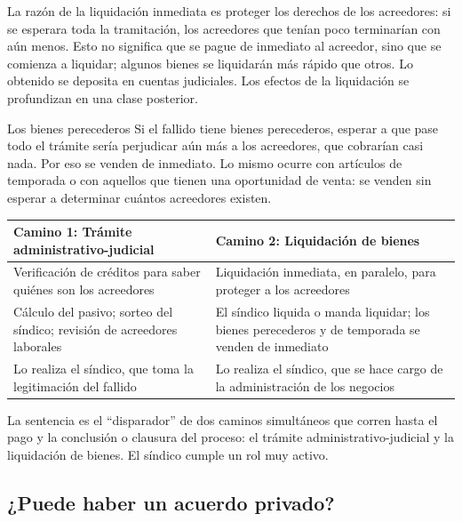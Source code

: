 \documentclass[12pt,oneside]{book}
\begin{document}
La razón de la liquidación inmediata es proteger los derechos de los acreedores: si se esperara toda la tramitación, los acreedores que tenían poco terminarían con aún menos. Esto no significa que se pague de inmediato al acreedor, sino que se comienza a liquidar; algunos bienes se liquidarán más rápido que otros. Lo obtenido se deposita en cuentas judiciales. Los efectos de la liquidación se profundizan en una clase posterior.

\begin{example}{Los bienes perecederos}
Si el fallido tiene bienes perecederos, esperar a que pase todo el trámite sería perjudicar aún más a los acreedores, que cobrarían casi nada. Por eso se venden de inmediato. Lo mismo ocurre con artículos de temporada o con aquellos que tienen una oportunidad de venta: se venden sin esperar a determinar cuántos acreedores existen.
\end{example}

\begin{table}[H]
\centering
\small
\begin{tabularx}{\textwidth}{>{\raggedright\arraybackslash}X >{\raggedright\arraybackslash}X}
\toprule
\textbf{Camino 1: Trámite administrativo-judicial} & \textbf{Camino 2: Liquidación de bienes} \\
\midrule
Verificación de créditos para saber quiénes son los acreedores & Liquidación inmediata, en paralelo, para proteger a los acreedores \\
Cálculo del pasivo; sorteo del síndico; revisión de acreedores laborales & El síndico liquida o manda liquidar; los bienes perecederos y de temporada se venden de inmediato \\
Lo realiza el síndico, que toma la legitimación del fallido & Lo realiza el síndico, que se hace cargo de la administración de los negocios \\
\bottomrule
\end{tabularx}
\end{table}

\begin{important}
La sentencia es el ``disparador'' de dos caminos simultáneos que corren hasta el pago y la conclusión o clausura del proceso: el trámite administrativo-judicial y la liquidación de bienes. El síndico cumple un rol muy activo.
\end{important}

\subsection{¿Puede haber un acuerdo privado?}
\end{document}
